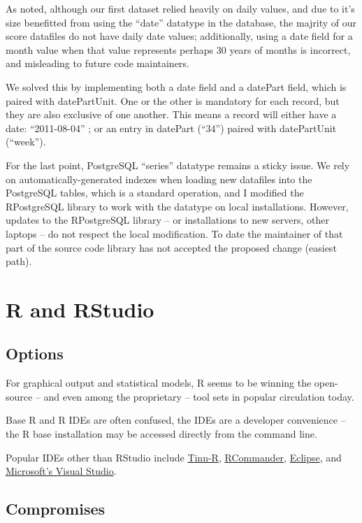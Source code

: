 \documentclass[logos,parttoc,morelanguage=french,morelanguage=german]{orsay-memoire}
\begin{document}
As noted, although our first dataset relied heavily on daily values, and due to it's size benefitted from using the ``date'' datatype in the database, the majrity of our score datafiles do not have daily date values; additionally, using a date field for a month value when that value represents perhaps 30 years of months is incorrect, and misleading to future code maintainers.

We solved this by implementing both a date field and a datePart field, which is paired with datePartUnit. One or the other is mandatory for each record, but they are also exclusive of one another. This means a record will either have a date: ``2011-08-04'' ; or an entry in datePart (``34'') paired with datePartUnit (``week'').

For the last point, PostgreSQL ``series'' datatype remains a sticky issue. We rely on automatically-generated indexes when loading new datafiles into the PostgreSQL tables, which is a standard operation, and I modified the RPostgreSQL library to work with the datatype on local installations. However, updates to the RPostgreSQL library -- or installations to new servers, other laptops -- do not respect the local modification. To date the maintainer of that part of the source code library has not accepted the proposed change (easiest path). 


\section{R and RStudio}

\subsection{Options}
For graphical output and statistical models, R seems to be winning the open-source -- and even among the proprietary -- tool sets in popular circulation today.

Base R and R IDEs are often confused, the IDEs are a developer convenience -- the R base installation may be accessed directly from the command line.

Popular IDEs other than RStudio include \href{https://sourceforge.net/projects/tinn-r/}{Tinn-R}, \href{https://cran.r-project.org/web/packages/Rcmdr/index.html}{RCommander}, \href{http://www.eclipse.org/downloads/packages/release/Luna/R}{Eclipse}, and \href{https://beta.visualstudio.com/vs/rtvs/}{Microsoft's Visual Studio}.

\subsection{Compromises}
\end{document}
